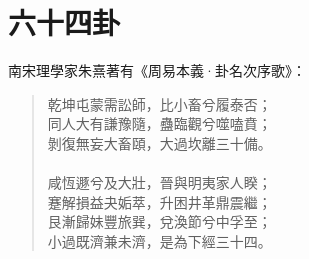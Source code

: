\section{六十四卦}

南宋理學家朱熹著有《周易本義·卦名次序歌》：
\begin{quote}
    乾坤屯蒙需訟師，比小畜兮履泰否；\\
    同人大有謙豫隨，蠱臨觀兮噬嗑賁；\\
    剝復無妄大畜頤，大過坎離三十備。\\
    \\
    咸恆遯兮及大壯，晉與明夷家人睽；\\
    蹇解損益夬姤萃，升困井革鼎震繼；\\
    艮漸歸妹豐旅巽，兌渙節兮中孚至；\\
    小過既濟兼未濟，是為下經三十四。\\
\end{quote}

